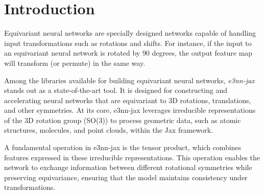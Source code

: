 \section{Introduction}
\label{sec:intro}


Equivariant neural networks\cite{e3nn} are specially designed networks capable of handling input transformations such as rotations and shifts. For instance, if the input to an equivariant neural network is rotated by 90 degrees, the output feature map will transform (or permute) in the same way.

Among the libraries available for building equivariant neural networks, \emph{e3nn-jax}\cite{e3nnjax} stands out as a state-of-the-art tool. It is designed for constructing and accelerating neural networks that are equivariant to 3D rotations, translations, and other symmetries. At its core, e3nn-jax leverages irreducible representations of the 3D rotation group (SO(3)) to process geometric data, such as atomic structures, molecules, and point clouds, within the Jax\cite{jax} framework.

A fundamental operation in e3nn-jax is the tensor product, which combines features expressed in these irreducible representations. This operation enables the network to exchange information between different rotational symmetries while preserving equivariance, ensuring that the model maintains consistency under transformations.

